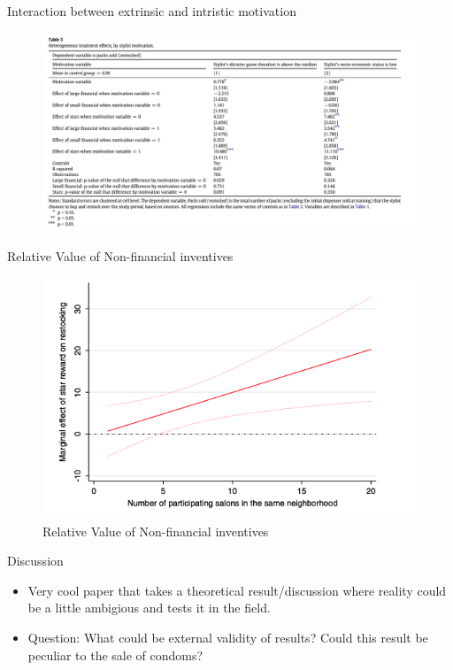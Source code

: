 \documentclass{beamer}
\begin{document}
\begin{frame}{Interaction between extrinsic and intristic motivation}
    \begin{figure}
        \centering
        \includegraphics[width=\textwidth]{T5.png}
        \label{fig:my_label}
    \end{figure}
\end{frame}



\begin{frame}{Relative Value of Non-financial inventives}
    \begin{figure}
        \centering
        \includegraphics[width=\textwidth]{F5.png}
        \caption{Relative Value of Non-financial inventives}
        \label{fig:my_label}
    \end{figure}
\end{frame}

\begin{frame}{Discussion}
\begin{itemize}
    \item Very cool paper that takes a theoretical result/discussion where reality could be a little ambigious and tests it in the field.
    \item Question: What could be external validity of results? Could this result be peculiar to the sale of condoms? 
\end{itemize}

\end{frame}
\end{document}
